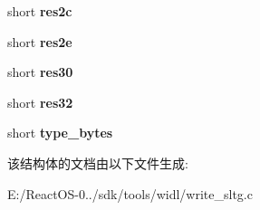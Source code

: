 \begin{DoxyCompactItemize}
short {\bfseries res2c}
\item 
\mbox{\label{structsltg__tail_a4bb2457ce06e2b6e8284070194332c05}} 
short {\bfseries res2e}
\item 
\mbox{\label{structsltg__tail_a79636ae65d3460c0ac6c69ef07901d05}} 
short {\bfseries res30}
\item 
\mbox{\label{structsltg__tail_a269b2f844ba654e09e32919abe7a11e5}} 
short {\bfseries res32}
\item 
\mbox{\label{structsltg__tail_aedbebb0389bb5e0ae68a53069df8fd4d}} 
short {\bfseries type\+\_\+bytes}
\end{DoxyCompactItemize}


该结构体的文档由以下文件生成\+:\begin{DoxyCompactItemize}
\item 
E\+:/\+React\+O\+S-\/0../sdk/tools/widl/write\+\_\+sltg.\+c\end{DoxyCompactItemize}
